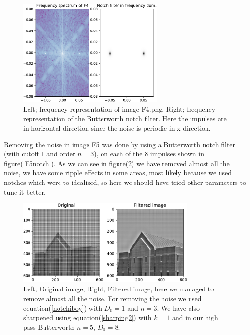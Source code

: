 {    \begin{figure}[!htb]
        {\centering
            \includegraphics[width=0.65\textwidth]{C7F4freq.pdf}
            \caption{Left; frequency representation of image F4.png, Right; frequency representation of the Butterworth notch filter. Here the impulses are in horizontal direction since the noise is periodic in x-direction.}
            \label{C7F4freq}
        \par}
        \end{figure}


Removing the noise in image F5 was done by using a Butterworth notch filter (with cutoff 1 and order $n = 3$), on each of the 8 impulses shown in figure(\ref{F5notch}). As we can see in figure(\ref{C7F5}) we have removed almost all the noise, we have some ripple effects in some areas, most likely because we used notches which were to idealized, so here we should have tried other parameters to tune it better.


\begin{figure}[!htb]
    {\centering
        \includegraphics[width=0.80\textwidth]{C7F5.pdf}
        \caption{Left; Original image, Right; Filtered image, here we managed to remove almost all the noise. For removing the noise we used equation(\ref{notchiboy}) with $D_{0} = 1$ and $n = 3$. We have also sharpened using equation(\ref{sharping2}) with $k = 1$ and in our high pass Butterworth $n = 5$, $D_{0} = 8$.}
        \label{C7F5}
    \par}
    \end{figure}

}
